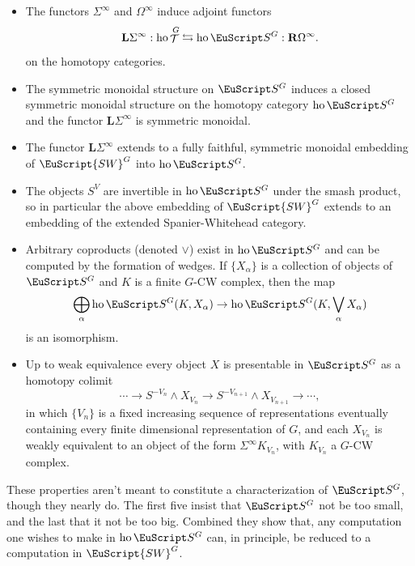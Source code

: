 \documentclass{amsart}
\theoremstyle{definition}
\theoremstyle{remark}
\newcommand{\spectra}{\EuScript S}
\newcommand{\swg}[1]{\EuScript {SW}^{#1}}
\DeclareMathOperator{\ho}{ho}
\DeclareMathOperator{\spaces}{\mathcal T}
\newcommand{\ugspaces}[1]{\spaces^{#1}}
\newcommand{\ugspectra}[1]{\spectra^{#1}}
\newcommand{\lder}{\mathbf{L}}
\newcommand{\rder}{\mathbf{R}}
\newcommand{\gswdes}[1]{\mathbf{Sp^{G}_{#1}}}
\begin{document}
\begin{itemize}
\item[$\gswdes{1}$]
The functors $\Sigma^{\infty}$ and
$\Omega^{\infty}$ induce adjoint functors 
\[
\lder\Sigma^{\infty}:\ho\ugspaces{G} \leftrightarrows \ho \ugspectra{G}: \rder\Omega^{\infty}.
\]
on the homotopy categories. 

\item[$\gswdes{2}$] The symmetric monoidal structure on
$\ugspectra{G}$ induces a closed symmetric monoidal structure on the
homotopy category $\ho\ugspectra{G}$ and the functor
$\lder\Sigma^{\infty}$ is symmetric monoidal.

\item[$\gswdes{3}$]   The functor
$\lder\Sigma^{\infty}$ extends to a fully faithful, symmetric monoidal
embedding of $\swg{G}$ into $\ho\ugspectra{G}$.

\item [$\gswdes{4}$] The objects $S^{V}$ are invertible in
$\ho\ugspectra{G}$ under the smash product, so in particular the above
embedding of $\swg{G}$ extends to an embedding of the extended
Spanier-Whitehead category.

\item [$\gswdes{5}$] Arbitrary coproducts (denoted $\vee$) exist in
$\ho\ugspectra{G}$ and can be computed by the formation of wedges.  If
$\{X_{\alpha} \}$ is a collection of objects of $\ugspectra{G}$ and
$K$ is a finite $G$-CW complex, then the map
\[
\bigoplus_{\alpha}\ho\ugspectra{G}(K,X_{\alpha}) \to 
\ho\ugspectra{G}(K,\bigvee_{\alpha}X_{\alpha}) 
\]
is an isomorphism.


\item[$\gswdes{6}$]
Up to weak equivalence every
object $X$ is presentable in $\ugspectra{G}$ as a homotopy colimit
\[
\cdots\to S^{-V_{n}}\wedge X_{V_{n}}\to S^{-V_{n+1}}\wedge
X_{V_{n+1}}\to\cdots,
\]
in which $\{V_{n}\}$ is a fixed increasing sequence of representations
eventually containing every finite dimensional representation of $G$,
and each $X_{V_{n}}$ is weakly equivalent to an object of the form
$\Sigma^{\infty}K_{V_{n}}$, with $K_{V_{n}}$ a $G$-CW complex.
\end{itemize}

These properties aren't meant to constitute a characterization of
$\ugspectra{G}$, though they nearly do.  The first five insist that
$\ugspectra{G}$ not be too small, and the last that it not be too big.
Combined they show that, any computation one wishes to make in
$\ho\ugspectra{G}$ can, in principle, be reduced to a computation in
$\swg{G}$.
\end{document}
